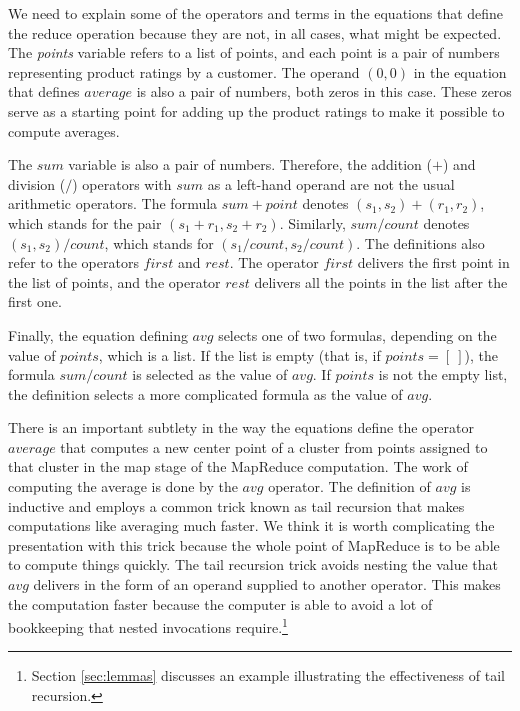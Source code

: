 We need to explain some of the operators and terms
in the equations that define the reduce operation 
because they are not, in all cases, what might be expected.
The \emph{points} variable refers to a list of points,
and each point is a pair of numbers representing product ratings
by a customer.
The operand $(0,0)$ in the equation that defines $average$ is
also a pair of numbers, both zeros in this case. 
These zeros serve as a starting point for adding
up the product ratings to make it possible to compute averages.

The $sum$ variable is also a pair of numbers.
Therefore, the addition ($+$) and division ($/$) operators
with $sum$ as a left-hand operand are not the usual arithmetic operators.
The formula $sum + point$ denotes $(s_1, s_2) + (r_1,r_2)$, 
which stands for the pair $(s_1+r_1, s_2+r_2)$. 
Similarly, $sum/count$ denotes $(s_1,s_2)/count$,
which stands for $(s_1/count, s_2/count)$.
The definitions also refer to the operators $first$ and $rest$.
The operator $first$ delivers the first point in the list of points,
and the operator $rest$ delivers all the points in the list
after the first one.

Finally, the equation defining $avg$ selects one of two formulas,
depending on the value of $points$, which is a list.
If the list is empty (that is, if $points = [~]$),
the formula $sum/count$ is selected as the value of $avg$.
If $points$ is not the empty list, the definition selects
a more complicated formula as the value of $avg$.

There is an important subtlety in the way the equations define
the operator $average$ that computes a new center point of a cluster
from points assigned to that cluster in the map stage of the
MapReduce computation.
The work of computing the average is done by the $avg$ operator.
The definition of $avg$ is inductive and 
employs a common trick known as tail recursion
that makes computations like averaging much faster.
We think it is worth complicating the presentation
with this trick because the whole point
of MapReduce is to be able to compute things quickly.
The tail recursion trick avoids nesting the value that $avg$ delivers
in the form of an operand supplied to another operator.
This makes the computation
faster because the computer is able to avoid a lot of bookkeeping that nested
invocations require.\footnote{Section \ref{sec:lemmas} discusses an
example illustrating the effectiveness of tail recursion.}


